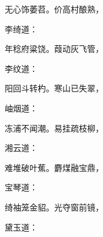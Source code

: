 \begin{poem}
    \begin{pl} 无心饰萎苕。价高村酿熟，\end{pl}
\end{poem}


\begin{parag}
    李绮道：
\end{parag}


\begin{poem}
    \begin{pl} 年稔府粱饶。葭动灰飞管，\end{pl}
\end{poem}


\begin{parag}
    李纹道：
\end{parag}


\begin{poem}
    \begin{pl} 阳回斗转杓。寒山已失翠，\end{pl}
\end{poem}


\begin{parag}
    岫烟道：
\end{parag}


\begin{poem}
    \begin{pl} 冻浦不闻潮。易挂疏枝柳，\end{pl}
\end{poem}


\begin{parag}
    湘云道：
\end{parag}


\begin{poem}
    \begin{pl} 难堆破叶蕉。麝煤融宝鼎，\end{pl}
\end{poem}


\begin{parag}
    宝琴道：
\end{parag}


\begin{poem}
    \begin{pl} 绮袖笼金貂。光夺窗前镜，\end{pl}
\end{poem}


\begin{parag}
    黛玉道：
\end{parag}


